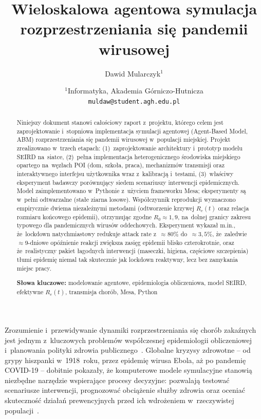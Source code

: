 \documentclass[polish]{projectreport}
\author{Dawid Mularczyk$^1$}
\title{Wieloskalowa agentowa symulacja rozprzestrzeniania się pandemii wirusowej}
\date{
    {\small $^1$Informatyka, Akademia Górniczo-Hutnicza \\
    \texttt{muldaw@student.agh.edu.pl}\\[2ex]%
    \the\year}
}
\begin{document}
\maketitle
\thispagestyle{empty}

\begin{abstract}
\noindent
Niniejszy dokument stanowi całościowy raport z~projektu, którego celem jest
zaprojektowanie i~stopniowa implementacja symulacji agentowej (Agent-Based
Model, ABM) rozprzestrzeniania się pandemii wirusowej w~populacji miejskiej.
Projekt zrealizowano w~trzech etapach: (1)~zaprojektowanie architektury
i~prototyp modelu SEIRD na~siatce, (2)~pełna implementacja heterogenicznego
środowiska miejskiego opartego na~węzłach POI (dom, szkoła, praca), mechanizmów
transmisji oraz interaktywnego interfejsu użytkownika wraz z~kalibracją
i~testami, (3)~właściwy eksperyment badawczy porównujący siedem scenariuszy
interwencji epidemicznych. Model zaimplementowano w~Pythonie z~użyciem
frameworku Mesa; eksperymenty są w~pełni odtwarzalne (stałe ziarna losowe).
Współczynnik reprodukcji wyznaczono empirycznie dwiema niezależnymi metodami
(odtworzenie krzywej $R_e(t)$ oraz relacja rozmiaru końcowego epidemii),
otrzymując zgodne $R_0 \approx 1{,}9$, na~dolnej granicy zakresu typowego dla
pandemicznych wirusów oddechowych. Eksperyment wykazał m.in., że~lockdown
natychmiastowy redukuje attack rate z~$\approx 80\%$ do~$\approx 3{,}5\%$,
że~zaledwie $\approx 9$-dniowe opóźnienie reakcji zwiększa zasięg epidemii
blisko czterokrotnie, oraz że~realistyczny pakiet łagodnych interwencji
(maseczki, higiena, częściowe szczepienia) tłumi epidemię niemal tak skutecznie
jak lockdown reaktywny, lecz bez zamykania miejsc pracy.

\noindent\textbf{Słowa kluczowe:} modelowanie agentowe, epidemiologia obliczeniowa,
model SEIRD, efektywne $R_e(t)$, transmisja chorób, Mesa, Python
\end{abstract}

\section{\SectionTitleIntroduction}
\label{sec:introduction}

Zrozumienie i~przewidywanie dynamiki rozprzestrzeniania się chorób zakaźnych
jest jednym z~kluczowych problemów współczesnej epidemiologii obliczeniowej
i~planowania polityki zdrowia publicznego~\cite{anderson1992infectious}.
Globalne kryzysy zdrowotne -- od grypy hiszpanki w~1918~roku, przez epidemię
wirusa Ebola, aż po pandemię COVID-19 -- dobitnie pokazały, że komputerowe
modele symulacyjne stanowią niezbędne narzędzie wspierające procesy decyzyjne:
pozwalają testować scenariusze interwencji, prognozować obciążenie służby
zdrowia oraz oceniać skuteczność działań prewencyjnych przed ich wdrożeniem
w~rzeczywistej populacji~\cite{tracy2018agent}.
\end{document}

